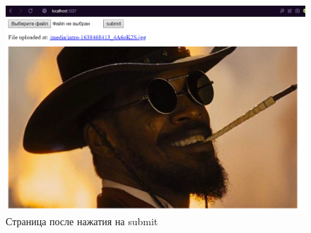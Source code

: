 \begin{figure}[!ht]
  \centering
  \includegraphics[scale=0.8]{ResearchNotes/rndhpc_dev_gui_2022_11_04/rndhpcgui.2022.11.04.picture4.png}
  \caption{Страница после нажатия на submit}
  \label{rndhpcgui.2022.11.04.picture4}
\end{figure}
\noteattributes{}
